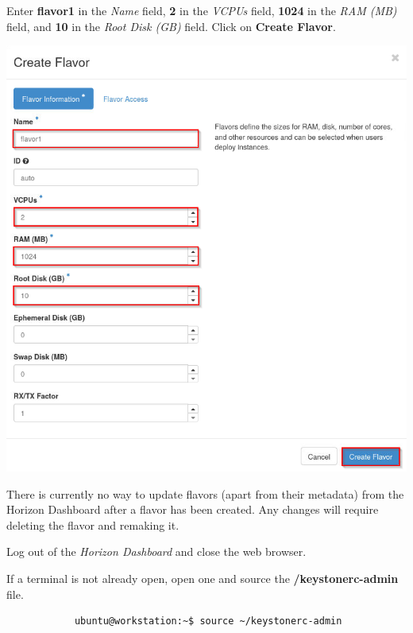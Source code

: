 \documentclass[letterpaper, 12pt]{article}
\begin{document}
\begin{enumerate}
    \begin{labstep}
        Enter \textbf{flavor1} in the \textit{Name} field, \textbf{2} in the \textit{VCPUs} field, \textbf{1024} in the \textit{RAM (MB)} field, and \textbf{10} in the \textit{Root Disk (GB)} field.
        Click on \textbf{Create Flavor}.

        \begin{center}
            \includegraphics[width=\linewidth]{images/part2/step4.png}
        \end{center}
    \end{labstep}

    \begin{notebox}
        There is currently no way to update flavors (apart from their metadata) from the Horizon Dashboard after a flavor has been created.
        Any changes will require deleting the flavor and remaking it.
    \end{notebox}

    \begin{labstep}
        Log out of the \textit{Horizon Dashboard} and close the web browser.
    \end{labstep}

    \begin{labstep}
        If a terminal is not already open, open one and source the \textbf{\texttildemid/keystonerc-admin} file.
        \begin{lstlisting}
            ubuntu@workstation:~$ source ~/keystonerc-admin
        \end{lstlisting}


\end{labstep}
\end{enumerate}
\end{document}
